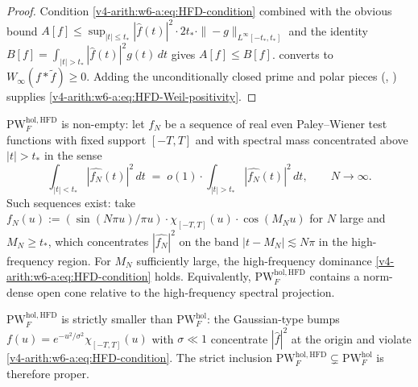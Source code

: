 \begin{proof}
Condition \eqref{v4-arith:w6-a:eq:HFD-condition} combined with the
obvious bound
\(A[f]\leq\sup_{|t|\leq t_{\ast}}|\widehat{f}(t)|^{2}\cdot 2t_{\ast}\cdot\|{-}g\|_{L^{\infty}[-t_{\ast},t_{\ast}]}\)
and the identity \(B[f]=\int_{|t|>t_{\ast}}|\widehat{f}(t)|^{2}g(t)\,dt\)
gives \(A[f]\leq B[f]\).  converts
to \(W_{\infty}(f*\widetilde{f})\geq 0\). Adding the unconditionally
closed prime and polar pieces
(,
) supplies
\eqref{v4-arith:w6-a:eq:HFD-Weil-positivity}.
\end{proof}

\begin{remark}
\label{v4-arith:w6-a:rem:HFD-nonempty}
\(\mathrm{PW}^{\mathrm{hol},\mathrm{HFD}}_{F}\) is non-empty: let \(f_{N}\)
be a sequence of real even Paley--Wiener test functions with fixed
support \([-T,T]\) and with spectral mass concentrated above
\(|t|>t_{\ast}\) in the sense
\begin{equation}
\label{v4-arith:w6-a:eq:HFD-concentration}
\int_{|t|<t_{\ast}}|\widehat{f_{N}}(t)|^{2}\,dt\;=\;o(1)\cdot\int_{|t|>t_{\ast}}|\widehat{f_{N}}(t)|^{2}\,dt,\qquad N\to\infty.
\end{equation}
Such sequences exist: take \(f_{N}(u):=(\sin(N\pi u)/\pi u)\cdot\chi_{[-T,T]}(u)\cdot\cos(M_{N}u)\)
for \(N\) large and \(M_{N}\geq t_{\ast}\), which concentrates
\(|\widehat{f_{N}}|^{2}\) on the band \(|t-M_{N}|\lesssim N\pi\) in the
high-frequency region. For \(M_{N}\) sufficiently large, the
high-frequency dominance
\eqref{v4-arith:w6-a:eq:HFD-condition} holds. Equivalently,
\(\mathrm{PW}^{\mathrm{hol},\mathrm{HFD}}_{F}\) contains a
norm-dense open cone relative to the high-frequency spectral
projection.
\end{remark}

\begin{remark}
\label{v4-arith:w6-a:rem:HFD-strict}
\(\mathrm{PW}^{\mathrm{hol},\mathrm{HFD}}_{F}\) is strictly smaller
than \(\mathrm{PW}^{\mathrm{hol}}_{F}\): the Gaussian-type bumps
\(f(u)=e^{-u^{2}/\sigma^{2}}\chi_{[-T,T]}(u)\) with \(\sigma\ll 1\)
concentrate \(|\widehat{f}|^{2}\) at the origin and violate
\eqref{v4-arith:w6-a:eq:HFD-condition}. The strict inclusion
\(\mathrm{PW}^{\mathrm{hol},\mathrm{HFD}}_{F}\subsetneq\mathrm{PW}^{\mathrm{hol}}_{F}\)
is therefore proper.
\end{remark}

